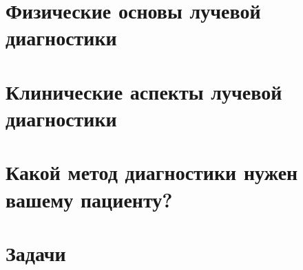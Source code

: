 \documentclass[a4paper,12pt]{report}
\begin{document}


\chapter{Физические основы лучевой диагностики} %







\chapter{Клинические аспекты лучевой диагностики} %



\chapter{Какой метод диагностики нужен вашему пациенту?} %



\chapter{Задачи}

\end{document}
